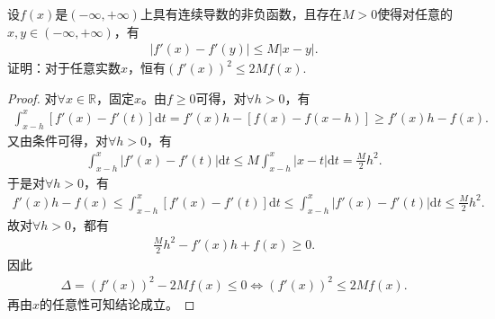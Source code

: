 \documentclass[../../main.tex]{subfiles}
\begin{document}
\begin{example}
设$f(x)$是$(-\infty,+\infty)$上具有连续导数的非负函数，且存在$M > 0$使得对任意的$x,y \in (-\infty,+\infty)$，有
\begin{align*}
|f'(x) - f'(y)| \leqslant M|x - y|.
\end{align*}
证明：对于任意实数$x$，恒有$(f'(x))^2 \leqslant 2Mf(x)$.
\end{example}
\begin{proof}
对$\forall x \in \mathbb{R}$，固定$x$。由$f \geqslant 0$可得，对$\forall h > 0$，有
\begin{align*}
\int_{x-h}^x [f'(x) - f'(t)] \mathrm{d}t = f'(x)h - [f(x) - f(x - h)] \geqslant f'(x)h - f(x).
\end{align*}
又由条件可得，对$\forall h > 0$，有
\begin{align*}
\int_{x-h}^x |f'(x) - f'(t)| \mathrm{d}t \leqslant M \int_{x-h}^x |x - t| \mathrm{d}t = \frac{M}{2}h^2.
\end{align*}
于是对$\forall h > 0$，有
\begin{align*}
f'(x)h - f(x) \leqslant \int_{x-h}^x [f'(x) - f'(t)] \mathrm{d}t \leqslant \int_{x-h}^x |f'(x) - f'(t)| \mathrm{d}t \leqslant \frac{M}{2}h^2.
\end{align*}
故对$\forall h > 0$，都有
\begin{align*}
\frac{M}{2}h^2 - f'(x)h + f(x) \geqslant 0.
\end{align*}
因此
\begin{align*}
\Delta = (f'(x))^2 - 2Mf(x) \leqslant 0 \Longleftrightarrow (f'(x))^2 \leqslant 2Mf(x).
\end{align*}
再由$x$的任意性可知结论成立。

\end{proof}
\end{document}
